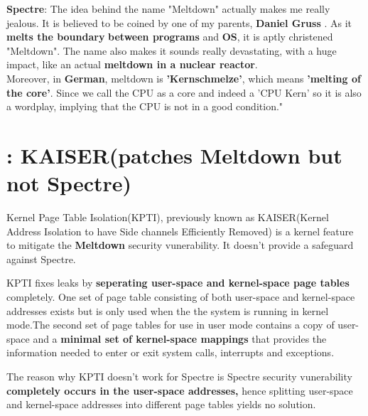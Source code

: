 \documentclass[12pt]{article}
\begin{document}
\begin{appendices}
	\textbf{Spectre}: The idea behind the name "Meltdown" actually makes me really jealous. It is believed to be coined by one of my parents, \textbf{Daniel Gruss} . As it \textbf{melts the boundary} \textbf{between programs} and \textbf{OS}, it is aptly christened "Meltdown". The name also makes it sounds really devastating, with a huge impact, like an actual \textbf{meltdown in a nuclear reactor}.\\
	Moreover, in \textbf{German}, meltdown is \textbf{'Kernschmelze'}, which means \textbf{'melting of the core'}. Since we call the CPU as a core and indeed a 'CPU Kern' so it is also a wordplay, implying that the CPU is not in a good condition."

\section{: KAISER(patches Meltdown but not Spectre)}

Kernel Page Table Isolation(KPTI), previously known as KAISER(Kernel Address Isolation to have Side channels Efficiently Removed) is a kernel feature to mitigate the \textbf{Meltdown} security vunerability. It doesn't provide a safeguard against Spectre.

KPTI fixes leaks by \textbf{seperating user-space and kernel-space page tables} completely. One set of page table consisting of both user-space and kernel-space addresses exists but is only used when the the system is running in kernel mode.The second set of page tables for use in user mode contains a copy of user-space and a \textbf{minimal set of kernel-space mappings} that provides the information needed to enter or exit system calls, interrupts and exceptions.

The reason why KPTI doesn't work for Spectre is Spectre security vunerability \textbf{completely occurs in the user-space addresses,} hence splitting user-space and kernel-space addresses into different page tables yields no solution.


	
\end{appendices}
\end{document}
